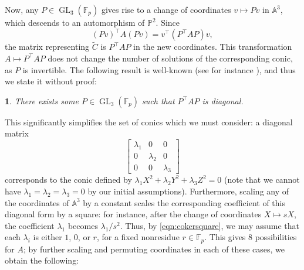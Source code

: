 \documentclass[10pt,a4paper]{amsart}
\numberwithin{equation}{section}
\numberwithin{figure}{section}
\numberwithin{table}{section}
\theoremstyle{definition}
\theoremstyle{plain}
\newtheorem{thm}{\protect\theoremname}[section]
\theoremstyle{remark}
\theoremstyle{plain}
\theoremstyle{definition}
\theoremstyle{plain}
\theoremstyle{plain}
\providecommand{\theoremname}{Theorem}
\newcommand{\A}{\mathbb{A}}
\renewcommand{\P}{\mathbb{P}}
\newcommand{\F}{\mathbb{F}}
\newcommand{\GL}{\operatorname{GL}}
\newcommand{\trsp}[1]{{{#1}^{\top}\!\!}}
\begin{document}
	Now, any $P\in\GL_3(\F_p)$ gives rise to a change of coordinates $v\mapsto Pv$ in $\A^3$, which descends to an automorphism of $\P^2$. Since
	\begin{equation*}
	\trsp{(Pv)} A(Pv)=\trsp{v}(\trsp{P} AP)v,
	\end{equation*}
	the matrix representing $\widetilde{C}$ is $\trsp{P}AP$ in the new coordinates. This transformation $A \mapsto \trsp{P}A P$ does not change the number of solutions of the corresponding conic, as $P$ is invertible. The following result is well-known (see for instance \cite[Prop.~42:1]{omeara}), and thus we state it without proof:
	\begin{thm}
		\label{thm:diag}
		There exists some $P\in\GL_3(\F_p)$ such that $\trsp{P}AP$ is diagonal.
	\end{thm}
	This significantly simplifies the set of conics which we must consider: a diagonal matrix
	\begin{equation*}
	\begin{bmatrix}
	\lambda_1&0&0\\
	0&\lambda_2&0\\
	0&0&\lambda_3
	\end{bmatrix}
	\end{equation*}
	corresponds to the conic defined by $\lambda_1X^2+\lambda_2Y^2+\lambda_3Z^2=0$ (note that we cannot have $\lambda_1=\lambda_2=\lambda_3=0$ by our initial assumptions). Furthermore, scaling any of the coordinates of $\A^3$ by a constant scales the corresponding coefficient of this diagonal form by a square: for instance, after the change of coordinates $X\mapsto sX$, the coefficient $\lambda_1$ becomes $\lambda_1/s^2$. Thus, by \eqref{eqn:cokersquare}, we may assume that each $\lambda_i$ is either $1$, $0$, or $r$, for a fixed nonresidue $r\in\F_p$. This gives $8$ possibilities for $A$; by further scaling and permuting coordinates in each of these cases, we obtain the following:
\end{document}
